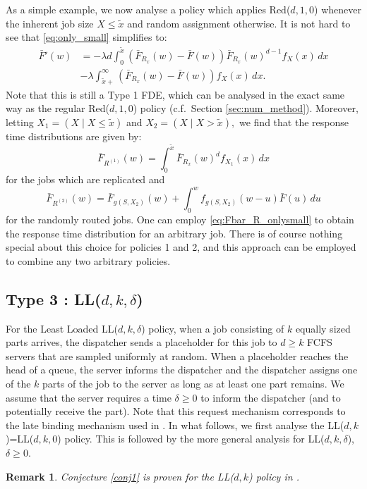 \documentclass[12pt]{report}
\newtheorem{remark}{Remark}
\begin{document}
As a simple example, we now analyse a policy which applies Red($d,1,0$) whenever the inherent job size $X \leq \tilde x$ and random assignment otherwise. It is not hard to see that \eqref{eq:only_small} simplifies to:
\begin{align*}
\bar F'(w)
&= -\lambda d \int_0^{\tilde{x}} (\bar F_{R_x}(w)-\bar F(w)) \bar F_{R_x}(w)^{d-1} f_X(x) \, dx\\
&- \lambda \int_{\tilde{x}+}^{\infty} (\bar F_{R_x}(w) - \bar F(w)) f_X(x)\, dx.
\end{align*}
Note that this is still a Type 1 FDE, which can be analysed in the exact same way as the regular Red($d,1,0$) policy (c.f.~Section \ref{sec:num_method}). Moreover, letting $X_1=(X \mid X \leq \tilde x)$ and $X_2=(X \mid X>\tilde x),$ we find that the response time distributions are given by:
$$
\bar F_{R^{(1)}}(w)
=
\int_0^{\tilde x} \bar F_{R_x}(w)^d f_{X_1}(x) \, dx
$$
for the jobs which are replicated and
$$
\bar F_{R^{(2)}}(w)=\bar F_{g(S,X_2)}(w) + \int_0^w f_{g(S,X_2)}(w-u) \bar F(u) \, du
$$
for the randomly routed jobs. One can employ \eqref{eq:Fbar_R_onlysmall} to obtain the response time distribution for an arbitrary job. There is of course nothing special about this choice for policies 1 and 2, and this approach can be employed to combine any two arbitrary policies.	

%
\subsection{Type 3 : LL($d,k,\delta$)}\label{sec:LLdkdelta}

For the Least Loaded LL($d,k,\delta$) policy, when a job consisting of $k$ equally sized parts arrives, 
the dispatcher sends a placeholder for this job to $d \geq k$ FCFS servers that are sampled uniformly at random.  When a placeholder reaches the head of a queue, the server informs the dispatcher
and the dispatcher assigns one of the $k$ parts of the job to the server as long as
at least one part remains. We assume that the server requires a time $\delta \geq 0$ to inform the 
dispatcher (and to potentially receive the part). Note that this request mechanism corresponds to the late binding mechanism used in \cite{Sparrow}.
In what follows, we first analyse the LL($d,k$)=LL($d,k,0$) policy. This is followed by the more general analysis for  LL($d,k,\delta$), $\delta \geq 0$.
\begin{remark}
	Conjecture \ref{conj1} is proven for the LL($d, k$) policy in \cite{shneer2020large}.
\end{remark}
\end{document}
